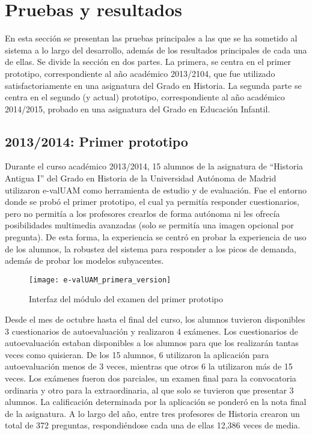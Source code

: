 \chapter{Pruebas y resultados\label{sec:pruebasYResultados}}

En esta sección se presentan las pruebas principales a las que se ha sometido al sistema a lo largo del desarrollo, además de los resultados principales de cada una de ellas. Se divide la sección en dos partes. La primera, se centra en el primer prototipo, correspondiente al año académico 2013/2104, que fue utilizado satisfactoriamente en una asignatura del Grado en Historia. La segunda parte se centra en el segundo (y actual) prototipo, correspondiente al año académico 2014/2015, probado en una asignatura del Grado en Educación Infantil.


\section{2013/2014: Primer prototipo}


Durante el curso académico 2013/2014, 15 alumnos de la asignatura de ``Historia Antigua I'' del Grado en Historia de la Universidad Autónoma de Madrid utilizaron \acrshort{e-valUAM} como herramienta de estudio y de evaluación. Fue el entorno donde se probó el primer prototipo, el cual ya permitía responder cuestionarios, pero no permitía a los profesores crearlos de forma autónoma ni les ofrecía posibilidades multimedia avanzadas (solo se permitía una imagen opcional por pregunta). De esta forma, la experiencia se centró en probar la experiencia de uso de los alumnos, la robustez del sistema para responder a los picos de demanda, además de probar los modelos subyacentes.

\begin{figure}[htp!]
	\centering
	\texttt{[image: e-valUAM\_primera\_version]}
	\caption{Interfaz del módulo del examen del primer prototipo}
	\label{fig:e-valUAM primera version}
\end{figure}

Desde el mes de octubre hasta el final del curso, los alumnos tuvieron disponibles 3 cuestionarios de autoevaluación y realizaron 4 exámenes. Los cuestionarios de autoevaluación estaban disponibles a los alumnos para que los realizarán tantas veces como quisieran. De los 15 alumnos, 6 utilizaron la aplicación para autoevaluación menos de 3 veces, mientras que otros 6 la utilizaron más de 15 veces. Los exámenes fueron dos parciales, un examen final para la convocatoria ordinaria y otro para la extraordinaria, al que solo se tuvieron que presentar 3 alumnos. La calificación determinada por la aplicación se ponderó en la nota final de la asignatura. A lo largo del año, entre tres profesores de Historia crearon un total de 372 preguntas, respondiéndose cada una de ellas 12,386 veces de media. 

